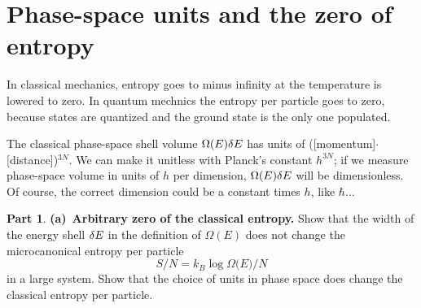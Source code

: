 \documentclass[11pt]{article}
\theoremstyle{definition}
\newtheorem{question}{Part}[section]
\numberwithin{equation}{section}
\numberwithin{figure}{section}
\begin{document}
\newpage
\section{Phase-space units and the zero of entropy}

In classical mechanics, entropy goes to minus infinity at the temperature is lowered to zero. In quantum mechnics the entropy per particle goes to zero, because states are quantized and the ground state is the only one populated.

The classical phase-space shell volume $\Omega(E)\var E$ has units of ([momentum]$\cdot$[distance])$^{3N}$. We can make it unitless with Planck's constant $h^{3N}$; if we measure phase-space volume in units of $h$ per dimension, $\Omega(E)\var E$ will be dimensionless. Of course, the correct dimension could be a constant times $h$, like $\hbar \ldots$

\begin{question}
\textbf{(a)}~\textbf{Arbitrary zero of the classical entropy.} Show that the width of the energy shell $\var E$ in the definition of $\Omega(E)$ does not change the microcanonical entropy per particle
\begin{equation}
S/N = k_B\log{\Omega(E})/N\label{eq:5.0}
\end{equation}
in a large system. Show that the choice of units in phase space does change the classical entropy per particle.
\end{question}
\end{document}
